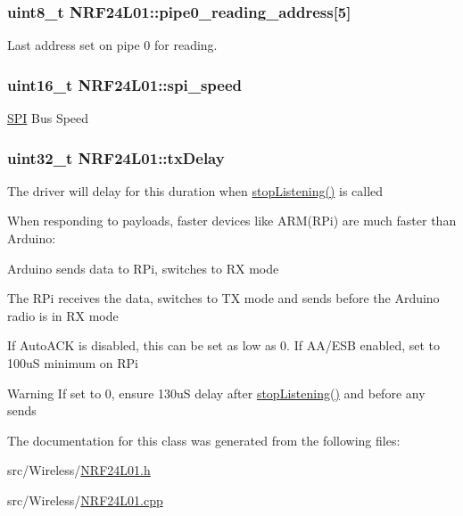 \subsubsection[{\texorpdfstring{pipe0\+\_\+reading\+\_\+address}{pipe0_reading_address}}]{\setlength{\rightskip}{0pt plus 5cm}uint8\+\_\+t N\+R\+F24\+L01\+::pipe0\+\_\+reading\+\_\+address\mbox{[}5\mbox{]}\hspace{0.3cm}{\ttfamily [private]}}\hypertarget{classNRF24L01_af836ff0a915587aa40b5eabe4101ea4c}{}\label{classNRF24L01_af836ff0a915587aa40b5eabe4101ea4c}
Last address set on pipe 0 for reading. 
\subsubsection[{\texorpdfstring{spi\+\_\+speed}{spi_speed}}]{\setlength{\rightskip}{0pt plus 5cm}uint16\+\_\+t N\+R\+F24\+L01\+::spi\+\_\+speed\hspace{0.3cm}{\ttfamily [private]}}\hypertarget{classNRF24L01_a4701641c1e8b3d082deb03f93c84d8c7}{}\label{classNRF24L01_a4701641c1e8b3d082deb03f93c84d8c7}
\hyperlink{classSPI}{S\+PI} Bus Speed 
\subsubsection[{\texorpdfstring{tx\+Delay}{txDelay}}]{\setlength{\rightskip}{0pt plus 5cm}uint32\+\_\+t N\+R\+F24\+L01\+::tx\+Delay}\hypertarget{classNRF24L01_a1feaab910ecff17805f8141fe40028e7}{}\label{classNRF24L01_a1feaab910ecff17805f8141fe40028e7}
The driver will delay for this duration when \hyperlink{classNRF24L01_a6ad13189b732f237ac148c659ddf6b01}{stop\+Listening()} is called

When responding to payloads, faster devices like A\+R\+M(\+R\+Pi) are much faster than Arduino\+:
\begin{DoxyEnumerate}
\item Arduino sends data to R\+Pi, switches to RX mode
\item The R\+Pi receives the data, switches to TX mode and sends before the Arduino radio is in RX mode
\item If Auto\+A\+CK is disabled, this can be set as low as 0. If A\+A/\+E\+SB enabled, set to 100uS minimum on R\+Pi
\end{DoxyEnumerate}

\begin{DoxyWarning}{Warning}
If set to 0, ensure 130uS delay after \hyperlink{classNRF24L01_a6ad13189b732f237ac148c659ddf6b01}{stop\+Listening()} and before any sends 
\end{DoxyWarning}


The documentation for this class was generated from the following files\+:\begin{DoxyCompactItemize}
\item 
src/\+Wireless/\hyperlink{NRF24L01_8h}{N\+R\+F24\+L01.\+h}\item 
src/\+Wireless/\hyperlink{NRF24L01_8cpp}{N\+R\+F24\+L01.\+cpp}\end{DoxyCompactItemize}
